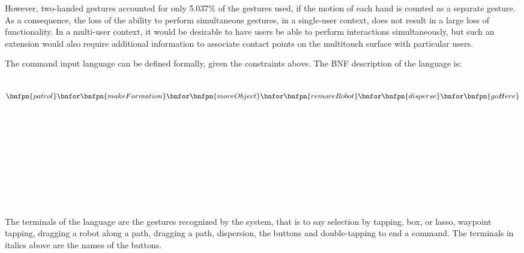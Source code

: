 However, two-handed gestures accounted for only 5.037\% of the gestures used, if the motion of each hand is counted as a separate gesture. 
As a consequence, the loss of the ability to perform simultaneous gestures, in a single-user context, does not result in a large loss of functionality.
In a multi-user context, it would be desirable to have users be able to perform interactions simultaneously, but such an extension would also require additional information to associate contact points on the multitouch surface with particular users. 

The command input language can be defined formally, given the constraints above. The BNF description of the language is:

\newenvironment{bnfsplit}[1][0.7\textwidth]
{\minipage[t]{#1}$}
{$\endminipage}

\begin{bnf}
	{ }\\
	{
		\begin{bnfsplit}
		\bnfpn{patrol} \bnfor \bnfpn{makeFormation} \bnfor \bnfpn{moveObject}\\
		\bnfor \bnfpn{removeRobot} \bnfor \bnfpn{disperse} \bnfor \bnfpn{goHere} 
		\vspace{2mm}
		\end{bnfsplit}
	}\\
	{}\\
	{}\\
	{}\\
	{}\\
	{}\\
	{ \bnfor {}}\\
	{ \bnfor {}}\\
	{}\\
	{ \bnfor {} \bnfor {}}\\
	{ \bnfor {}}
\end{bnf}

The terminals of the language are the gestures recognized by the system, that is to say selection by tapping, box, or lasso, waypoint tapping, dragging a robot along a path, dragging a path, dispersion, the buttons and double-tapping to end a command. 
The terminals in italics above are the names of the buttons. 